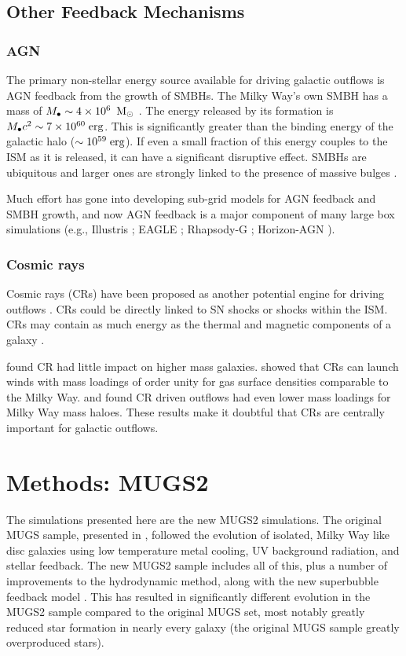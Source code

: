 \subsection{Other Feedback Mechanisms}
\subsubsection{AGN}
The primary non-stellar energy source available for driving galactic outflows is
AGN feedback from the growth of SMBHs.  The Milky Way's
own SMBH has a mass of $M_{\bullet}\sim4\times10^{6}\;\>{\rm M_{\odot}}$ \citep{Meyer2012}.
The energy released by its formation is
$M_{\bullet}c^2\sim7\times10^{60}\;\rm{erg}$.  This is significantly greater
than the binding energy of the galactic halo ($\sim10^{59}\;\rm{erg}$).  If even
a small fraction of this energy couples to the ISM as it is released, it can
have a significant disruptive effect.  SMBHs are ubiquitous and larger ones are
strongly linked to the presence of massive bulges
\citep{Magorrian1998}.

Much effort has gone into developing sub-grid models for AGN feedback and SMBH
growth, and now AGN feedback is a major component of many large box simulations
(e.g., Illustris \citet{Sijacki2015}; EAGLE \citet{Crain2015}; Rhapsody-G
\citet{Hahn2015}; Horizon-AGN \citet{Dubois2014}).

\subsubsection{Cosmic rays}
Cosmic rays (CRs) have been proposed as another potential engine for
driving outflows \citep{Ipavich1975,Breitschwerdt1991,Everett2008,Socrates2008}.
CRs could be directly linked to SN shocks or shocks within the ISM.
CRs may contain as much energy as the thermal and magnetic components of
a galaxy \citep{Zweibel1995}.

\citet{Jubelgas2008} found CR had little impact on higher mass galaxies.
\citet{Girichidis2015} showed that CRs can launch winds with mass
loadings of order unity for gas surface densities comparable to the Milky Way.
\citet{Salem2014} and \cite{Booth2013} found CR driven outflows had even lower
mass loadings for Milky Way mass haloes.  These results make it doubtful that
CRs are centrally important for galactic outflows.


\section{Methods: MUGS2}
The simulations presented here are the new MUGS2 simulations.  The original MUGS
sample, presented in \citet{Stinson2010},  followed the evolution of isolated,
Milky Way like disc galaxies using low temperature metal cooling, UV background
radiation, and stellar feedback. The new MUGS2 sample includes all of this, 
plus a number of improvements to the hydrodynamic method, along with
the new superbubble feedback model \citep{Keller2014}.  This has resulted in
significantly different evolution in the MUGS2 sample compared to the original
MUGS set, most notably greatly reduced star formation in nearly every galaxy
(the original MUGS sample greatly overproduced stars).

